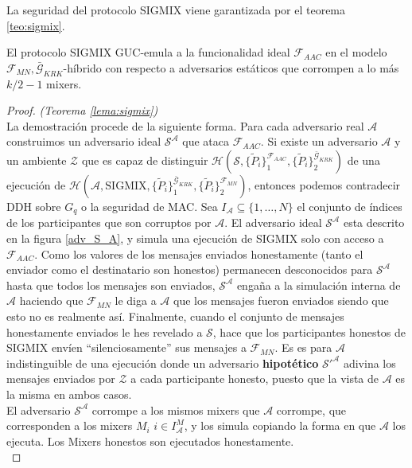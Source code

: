 La seguridad del protocolo SIGMIX viene garantizada por el teorema \ref{teo:sigmix}.


\begin{lema} 
El protocolo SIGMIX GUC-emula a la funcionalidad ideal $\mathcal{F}_{AAC}$ en el modelo
$\mathcal{F}_{MN}, \bar{\mathcal{G}}_{KRK}$-híbrido con respecto a adversarios
estáticos que corrompen a lo más $k/2 -1$ mixers.
\label{lema:sigmix}
\end{lema}

\begin{proof}
\textit{(Teorema \ref{lema:sigmix})}\\
La demostración procede de la siguiente forma. Para cada adversario real $\mathcal{A}$ construimos
un adversario ideal $\mathcal{S^A}$ que ataca $\mathcal{F}_{AAC}$. Si existe un adversario
$\mathcal{A}$ y un ambiente $\mathcal{Z}$ que es capaz de distinguir
$\mathcal{H}(\mathcal{S},
             \{\tilde{P}_i\}_1^{\mathcal{F}_{AAC}},
             \{\tilde{P}_i\}_2^{\bar{\mathcal{G}}_{KRK}})$
de una ejecución de
$\mathcal{H}(\mathcal{A},
             \textrm{SIGMIX}, 
             \{\tilde{P}_i\}_1^{\bar{\mathcal{G}}_{KRK}},
             \{\tilde{P}_i\}_2^{\mathcal{F}_{MN}})$,
entonces podemos contradecir DDH sobre $G_q$ o la seguridad de MAC.
Sea $I_\mathcal{A} \subseteq \{1, \ldots , N \}$ el conjunto de índices de los participantes que
son corruptos por $\mathcal{A}$. El adversario ideal $\mathcal{S^A}$ esta descrito en la figura
\ref{adv_S_A}, y simula una ejecución de SIGMIX solo con acceso a $\mathcal{F}_{AAC}$. Como los
valores de los mensajes enviados honestamente (tanto el enviador como el destinatario son honestos)
permanecen desconocidos para $\mathcal{S^A}$ hasta que todos los mensajes son enviados, $\mathcal{S^A}$
engaña a la simulación interna de $\mathcal{A}$ haciendo que $\mathcal{F}_{MN}$ le diga a $\mathcal{A}$
que los mensajes fueron enviados siendo que esto no es realmente así. Finalmente, cuando el conjunto de
mensajes honestamente enviados le hes revelado a $\mathcal{S}$, hace que los participantes honestos
de SIGMIX envíen ``silenciosamente'' sus mensajes a $\mathcal{F}_{MN}$. Es es para $\mathcal{A}$ 
indistinguible de una ejecución donde un adversario \textbf{hipotético} $\mathcal{S}'^{\mathcal{A}}$
adivina los mensajes enviados por $\mathcal{Z}$ a cada participante honesto, puesto que la vista
de $\mathcal{A}$ es la misma en ambos casos.\\
El adversario $\mathcal{S^A}$ corrompe a los mismos mixers que $\mathcal{A}$ corrompe, que
corresponden a los mixers $M_i$ $i \in I^M_\mathcal{A}$, y los simula
copiando la forma en que $\mathcal{A}$ los ejecuta. Los Mixers honestos son ejecutados
honestamente.\\


\end{proof}
